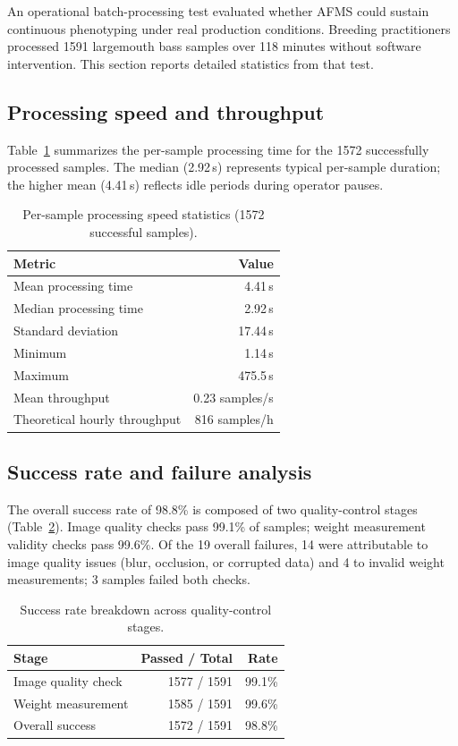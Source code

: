 \documentclass[9pt]{osa-supplemental-document}
\begin{document}
An operational batch-processing test evaluated whether AFMS could sustain continuous phenotyping under real production conditions. Breeding practitioners processed 1591 largemouth bass samples over 118 minutes without software intervention. This section reports detailed statistics from that test.

\subsection{Processing speed and throughput}

Table~\ref{tab:processing_speed} summarizes the per-sample processing time for the 1572 successfully processed samples. The median (2.92\,s) represents typical per-sample duration; the higher mean (4.41\,s) reflects idle periods during operator pauses.

\begin{table}[htbp]
\centering
\caption{Per-sample processing speed statistics (1572 successful samples).}
\label{tab:processing_speed}
\small
\begin{tabular}{lr}
\toprule
\textbf{Metric} & \textbf{Value} \\
\midrule
Mean processing time & 4.41\,s \\
Median processing time & 2.92\,s \\
Standard deviation & 17.44\,s \\
Minimum & 1.14\,s \\
Maximum & 475.5\,s \\
Mean throughput & 0.23 samples/s \\
Theoretical hourly throughput & 816 samples/h \\
\bottomrule
\end{tabular}
\end{table}

\subsection{Success rate and failure analysis}

The overall success rate of 98.8\% is composed of two quality-control stages (Table~\ref{tab:success_rate}). Image quality checks pass 99.1\% of samples; weight measurement validity checks pass 99.6\%. Of the 19 overall failures, 14 were attributable to image quality issues (blur, occlusion, or corrupted data) and 4 to invalid weight measurements; 3 samples failed both checks.

\begin{table}[htbp]
\centering
\caption{Success rate breakdown across quality-control stages.}
\label{tab:success_rate}
\small
\begin{tabular}{lrr}
\toprule
\textbf{Stage} & \textbf{Passed / Total} & \textbf{Rate} \\
\midrule
Image quality check    & 1577 / 1591 & 99.1\% \\
Weight measurement     & 1585 / 1591 & 99.6\% \\
Overall success        & 1572 / 1591 & 98.8\% \\
\bottomrule
\end{tabular}
\end{table}
\end{document}
